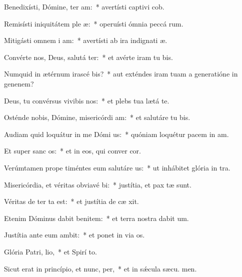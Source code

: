 \item Benedixísti, Dómine, ter am:~* avertísti captivi cob.
\item Remisísti iniquitátem ple æ:~* operuísti ómnia peccá rum.
\item Mitigásti omnem i am:~* avertísti ab ira indignati æ.
\item Convérte nos, Deus, salutá ter:~* et avérte iram tu  bis.
\item Numquid in ætérnum irascé bis?~* aut exténdes iram tuam a generatióne in genenem?
\item Deus, tu convérsus vivibis nos:~* et plebs tua lætá  te.
\item Osténde nobis, Dómine, misericórdi am:~* et salutáre tu  bis.
\item Audiam quid loquátur in me Dómi us:~* quóniam loquétur pacem in  am.
\item Et super sanc os:~* et in eos, qui conver  cor.
\item Verúmtamen prope timéntes eum salutáre us:~* ut inhábitet glória in  tra.
\item Misericórdia, et véritas obviavé bi:~* justítia, et pax tæ sunt.
\item Véritas de ter ta est:~* et justítia de cæ xit.
\item Etenim Dóminus dabit benitem:~* et terra nostra dabit  um.
\item Justítia ante eum ambit:~* et ponet in via  os.
\item Glória Patri,  lio,~* et Spirí to.
\item Sicut erat in princípio, et nunc,  per,~* et in sǽcula sæcu. men.
